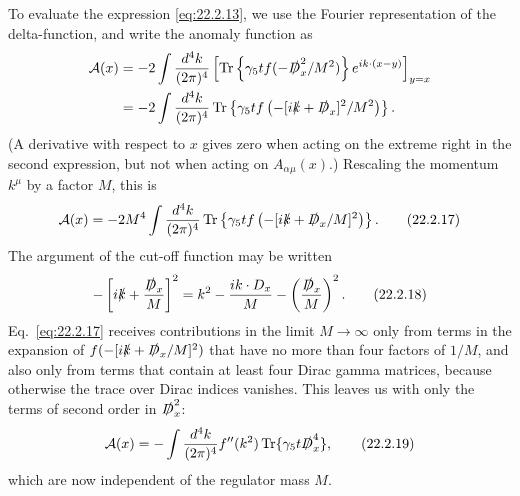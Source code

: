 To evaluate the expression \eqref{eq:22.2.13}, we use the Fourier
representation of the delta-function, and write the anomaly function as
\[
 \begin{aligned}
 \mathcal A(x)
 &=-2\int\frac{d^4k}{(2\pi)^4}
 \left[
  \operatorname{Tr}\left\{\gamma_5t f(-\sl{D}_x^2/M^2)\right\}
  e^{ik\cdot(x-y)}
 \right]_{y=x}\\
 &=-2\int\frac{d^4k}{(2\pi)^4}
 \operatorname{Tr}\left\{\gamma_5t
 f\left(-[i\sl{k}+\sl{D}_x]^2/M^2\right)\right\}.
 \end{aligned}
\]
(A derivative with respect to $x$ gives zero when acting on the extreme
right in the second expression, but not when acting on
$A_{\alpha\mu}(x)$.) Rescaling the momentum $k^\mu$ by a factor $M$, this
is
\begin{equation}
 \mathcal A(x)=-2M^4\int\frac{d^4k}{(2\pi)^4}
 \operatorname{Tr}\left\{\gamma_5t
 f\left(-[i\sl{k}+\sl{D}_x/M]^2\right)\right\}.
 \tag{22.2.17}\label{eq:22.2.17}
\end{equation}
The argument of the cut-off function may be written
\begin{equation}
 -\left[i\sl{k}+\frac{\sl{D}_x}{M}\right]^2
 =k^2-\frac{ik\cdot D_x}{M}
 -\left(\frac{\sl{D}_x}{M}\right)^2.
 \tag{22.2.18}\label{eq:22.2.18}
\end{equation}
Eq.~\eqref{eq:22.2.17} receives contributions in the limit
$M\to\infty$ only from terms in the expansion of
$f(-[i\sl{k}+\sl{D}_x/M]^2)$ that have no more than four factors of
$1/M$, and also only from terms that contain at least four Dirac gamma
matrices, because otherwise the trace over Dirac indices vanishes. This
leaves us with only the terms of second order in $\sl{D}_x^2$:
\begin{equation}
 \mathcal A(x)=-\int\frac{d^4k}{(2\pi)^4}f''(k^2)
 \operatorname{Tr}\{\gamma_5t\sl{D}_x^4\},
 \tag{22.2.19}\label{eq:22.2.19}
\end{equation}
which are now independent of the regulator mass $M$.

